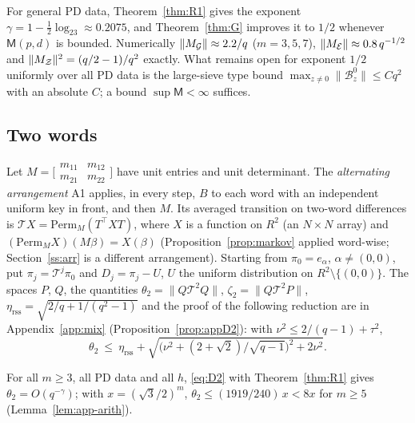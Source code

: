 \begin{remark}\label{rem:exp}
For general PD data, Theorem~\ref{thm:R1} gives the exponent $\gamma=1-\frac12\log_23\approx0.2075$, and
Theorem~\ref{thm:G} improves it to $1/2$ whenever $\mathsf M(p,d)$ is bounded. Numerically $\|M_{\mathcal{G}}\|\approx2.2/q$ ($m=3,5,7$),
$\|M_{\mathcal{E}}\|\approx0.8\,q^{-1/2}$ and $\|M_{\mathcal{Z}}\|^2=(q/2-1)/q^2$ exactly. What remains open for exponent $1/2$ uniformly over all PD data is
the large-sieve type bound $\max_{z\ne0}\|\mathcal B^0_z\|\le Cq^2$ with an absolute $C$; a bound $\sup\mathsf M<\infty$ suffices.
\end{remark}

\subsection{Two words}
Let $M=\bigl[\begin{smallmatrix}m_{11}&m_{12}\\m_{21}&m_{22}\end{smallmatrix}\bigr]$ have unit entries and unit determinant. The
\emph{alternating arrangement} A1 applies, in every step, $B$ to each word with an independent uniform key in front, and then $M$.
Its averaged transition on two-word differences is $\mathcal TX=\mathrm{Perm}_M(T^\top XT)$, where $X$ is a function on $R^2$ (an
$N\times N$ array) and $(\mathrm{Perm}_MX)(M\beta)=X(\beta)$ (Proposition~\ref{prop:markov} applied word-wise; Section~\ref{ss:arr}
is a different arrangement). Starting from $\pi_0=e_\alpha$, $\alpha\ne(0,0)$, put $\pi_j=\mathcal T^j\pi_0$ and $D_j=\pi_j-U$, $U$ the uniform
distribution on $R^2\setminus\{(0,0)\}$. The spaces $P$, $Q$, the quantities $\theta_2=\|Q\mathcal T^2Q\|$, $\zeta_2=\|Q\mathcal T^2P\|$,
$\eta_{\mathrm{rss}}=\sqrt{2/q+1/(q^2-1)}$ and the proof of the following reduction are in Appendix~\ref{app:mix}
(Proposition~\ref{prop:appD2}): with $\nu^2\le2/(q-1)+\tau^2$,
\begin{equation}\label{eq:D2}
\theta_2\ \le\ \eta_{\mathrm{rss}}+\sqrt{\bigl(\nu^2+(2+\sqrt2)/\sqrt{q-1}\bigr)^2+2\nu^2}.
\end{equation}
\begin{corollary}\label{cor:N1}
For all $m\ge3$, all PD data and all $h$, \eqref{eq:D2} with Theorem~\ref{thm:R1} gives
$\theta_2=O(q^{-\gamma})$; with $x=(\sqrt3/2)^m$, $\theta_2\le(1919/240)\,x<8x$ for $m\ge5$ (Lemma~\ref{lem:app-arith}).
\end{corollary}

